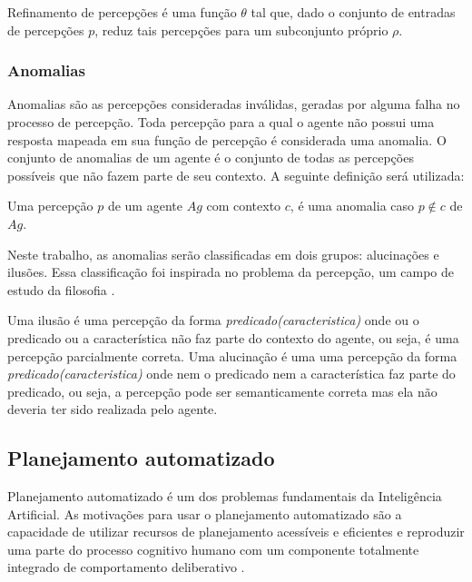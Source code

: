 \vspace{0.2cm}

\begin{definition}
    \label{def:refinamento}
    Refinamento de percepções é uma função $\theta$ tal que, dado o conjunto de entradas de percepções $p$, reduz tais percepções para um subconjunto próprio $\rho$.
\end{definition}

\subsubsection{Anomalias}

\label{anomalias}

Anomalias são as percepções consideradas inválidas, geradas por alguma falha no processo de percepção. Toda percepção para a qual o agente não possui uma resposta mapeada em sua função de percepção é considerada uma anomalia. O conjunto de anomalias de um agente é o conjunto de todas as percepções possíveis que não fazem parte de seu contexto. A seguinte definição será utilizada:

\vspace{0.2cm}

\begin{definition}
    Uma percepção $p$ de um agente $Ag$ com contexto $c$, é uma anomalia caso $p \notin c$ de $Ag$.
\end{definition}

Neste trabalho, as anomalias serão classificadas em dois grupos: alucinações e ilusões. Essa classificação foi inspirada no problema da percepção, um campo de estudo da filosofia \cite{perception-problem}.

Uma ilusão é uma percepção da forma \textit{predicado(caracteristica)} onde ou o predicado ou a característica não faz parte do contexto do agente, ou seja, é uma percepção parcialmente correta. Uma alucinação é uma uma percepção da forma \textit{predicado(caracteristica)} onde nem o predicado nem a característica faz parte do predicado, ou seja, a percepção pode ser semanticamente correta mas ela não deveria ter sido realizada pelo agente.

\subsection{Planejamento automatizado}

Planejamento automatizado é um dos problemas fundamentais da Inteligência Artificial. As motivações para usar o planejamento automatizado são a capacidade de utilizar recursos de planejamento acessíveis e eficientes e reproduzir uma parte do processo cognitivo humano com um componente totalmente integrado de comportamento deliberativo \cite{GHALLAB20041}.

